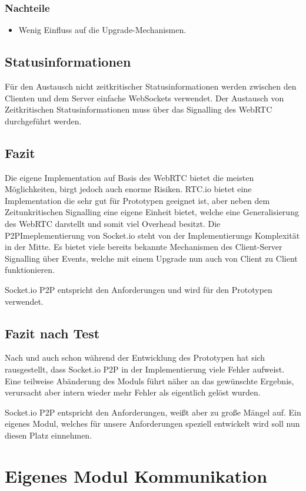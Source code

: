 \subsubsection{Nachteile}
\begin{itemize}
\item
Wenig Einfluss auf die Upgrade-Mechanismen.
\end{itemize}

\subsection{Statusinformationen}
Für den Austausch nicht zeitkritischer Statusinformationen werden zwischen den Clienten und dem Server einfache WebSockets verwendet. Der Austausch von Zeitkritischen Statusinformationen muss über das Signalling des WebRTC durchgeführt werden.

\subsection{Fazit}
Die eigene Implementation auf Basis des WebRTC bietet die meisten Möglichkeiten, birgt jedoch auch enorme Risiken. RTC.io bietet eine Implementation die sehr gut für Prototypen geeignet ist, aber neben dem Zeitunkritischen Signalling eine eigene Einheit bietet, welche eine Generalisierung des WebRTC darstellt und somit viel Overhead besitzt. Die P2PImeplementierung von Socket.io steht von der Implementierungs Komplexität in der Mitte. Es bietet viele bereits bekannte Mechanismen des Client-Server Signalling über Events, welche mit einem Upgrade nun auch von Client zu Client funktionieren. 

Socket.io P2P entspricht den Anforderungen und wird für den Prototypen verwendet.

\subsection{Fazit nach Test}
Nach und auch schon während der Entwicklung des Prototypen hat sich rausgestellt, dass Socket.io P2P in der Implementierung viele Fehler aufweist. Eine teilweise Abänderung des Moduls führt näher an das gewünschte Ergebnis, verursacht aber intern wieder mehr Fehler als eigentlich gelöst wurden.

Socket.io P2P entspricht den Anforderungen, weißt aber zu große Mängel auf. Ein eigenes Modul, welches für unsere Anforderungen speziell entwickelt wird soll nun diesen Platz einnehmen.

\section{Eigenes Modul Kommunikation}
